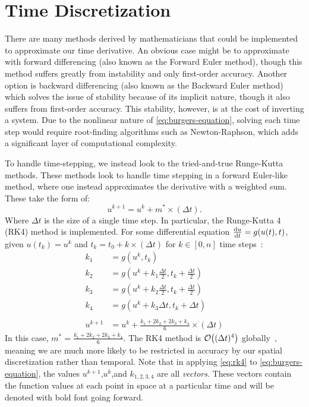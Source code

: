 \documentclass[11pt, letterpaper]{article}
\numberwithin{equation}{section}
\begin{document}
	\section{Time Discretization} \label{sec:time-discretization}
	There are many methods derived by mathematicians that could be implemented to approximate our time derivative.
	An obvious case might be to approximate with forward differencing (also known as the Forward Euler method), though this method suffers greatly from instability and only first-order accuracy.
	Another option is backward differencing (also known as the Backward Euler method) which solves the issue of stability because of its implicit nature, though it also suffers from first-order accuracy.
	This stability, however, is at the cost of inverting a system.
	Due to the nonlinear nature of \cref{eq:burgers-equation}, solving each time step would require root-finding algorithms such as Newton-Raphson, which adds a significant layer of computational complexity.

	To handle time-stepping, we instead look to the tried-and-true Runge-Kutta methods.
	These methods look to handle time stepping in a forward Euler-like method, where one instead approximates the derivative with a weighted sum.
	These take the form of:
	\begin{equation}
		\label{eq:general-rk-method}
		u^{k+1}=u^k+m^* \times (\Delta t).
	\end{equation}
	Where $\Delta t$ is the size of a single time step.
	In particular, the Runge-Kutta 4 (RK4) method is implemented.
	For some differential equation $\dv{u}{t}=g(u(t),t)$, given $u(t_k)=u^k$ and $t_k=t_0+k\times(\Delta t)$ for $k\in[0,n]$ time steps~\cite{FourthOrderRungeKutta}:
	\begin{equation}
		\label{eq:rk4}
		\begin{split}
			k_1&=g\left( u^k,t_k \right)\\
			k_2&=g\left( u^k+k_1\frac{\Delta t}{2},t_k+\frac{\Delta t}{2} \right)\\
			k_3&=g\left( u^k+k_2\frac{\Delta t}{2},t_k+\frac{\Delta t}{2} \right)\\
			k_4 &= g\left( u^k+k_3 \Delta t,t_k+\Delta t \right)\\ \\
			u^{k+1}&=u^k+\frac{k_1+2k_2+2k_3+k_4}{6}\times(\Delta t)
		\end{split}
	\end{equation}
	In this case, $m^* = \frac{k_1+2k_2+2k_3+k_4}{6}$.
	The RK4 method is $\order{(\Delta t)^4}$ globally~\cite{FourthOrderRungeKutta}, meaning we are much more likely to be restricted in accuracy by our spatial discretization rather than temporal.
	Note that in applying \cref{eq:rk4} to \cref{eq:burgers-equation}, the values $u^{k+1}$,$u^k$,and $k_{1,2,3,4}$ are all \textit{vectors}.
	These vectors contain the function values at each point in space at a particular time and will be denoted with bold font going forward.
\end{document}
